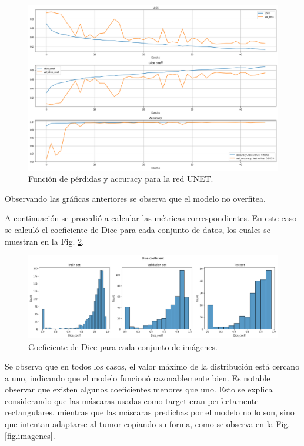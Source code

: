 \begin{figure}[H]
\centering
        \includegraphics[width=0.8\linewidth]{chapters/segmentacion/images/metricas.png}
        \caption{Función de pérdidas y accuracy para la red UNET.}
        \label{fig.loss}
  \end{figure}

Observando las gráficas anteriores se observa que el modelo no overfitea. 

A continuación se procedió a calcular las métricas correspondientes. En este caso se calculó el coeficiente de Dice para cada conjunto de datos, los cuales se muestran en la Fig. \ref{fig.dice}.


\begin{figure}[H]
\centering
        \includegraphics[width=0.9\linewidth]{chapters/segmentacion/images/dice.png}
        \caption{Coeficiente de Dice para cada conjunto de imágenes.}
        \label{fig.dice}
  \end{figure}

Se observa que en todos los casos, el valor máximo de la distribución está cercano a uno, indicando que el modelo funcionó razonablemente bien. Es notable observar que existen algunos coeficientes menores que uno. Esto se explica considerando que las máscaras usadas como target eran perfectamente rectangulares, mientras que las máscaras predichas por el modelo no lo son, sino que intentan adaptarse al tumor copiando su forma, como se observa en la Fig. \ref{fig.imagenes}. 

